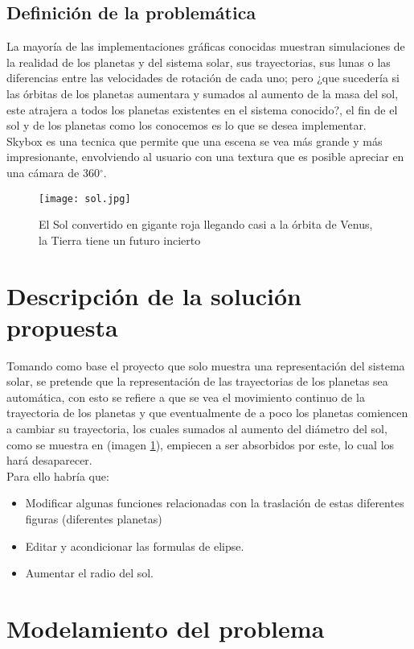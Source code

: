 \documentclass[12pt,journal,compsoc]{IEEEtran}
\begin{document}
\subsection{Definición de la problemática}
La mayoría de las implementaciones gráficas conocidas muestran simulaciones de la realidad de los planetas y del sistema solar, sus trayectorias, sus lunas o las diferencias entre las velocidades de rotación de cada uno; pero ¿que sucedería si las órbitas de los planetas aumentara y sumados al aumento de la masa del sol, este atrajera a todos los planetas existentes en el sistema conocido?, el fin de el sol y de los planetas como los conocemos es lo que se desea implementar.\\
Skybox es una tecnica que permite que una escena se vea más grande y más impresionante, envolviendo al usuario con una textura que es posible apreciar en una cámara de 360$^{\circ}$\cite{skybox2}.
\begin{figure}[h!]
  \texttt{[image: sol.jpg]}
  \caption{El Sol convertido en gigante roja llegando casi a la órbita de Venus, la Tierra tiene un futuro incierto}
  \captionsetup{justification=centering}
  \label{muerte}
\end{figure}
\section{Descripción de la solución propuesta}
Tomando como base el proyecto que solo muestra una representación del sistema solar, se pretende que la representación de las trayectorias de los planetas sea automática, con esto se refiere a que se vea el movimiento continuo de la trayectoria de los planetas y que eventualmente de a poco los planetas comiencen a cambiar su trayectoria, los cuales sumados al aumento del diámetro del sol, como se muestra en (imagen \ref{muerte}), empiecen a ser absorbidos por este, lo cual los hará desaparecer\cite{far}.\\
Para ello habría que:
\begin{itemize}
 \item Modificar algunas funciones relacionadas con la traslación de estas diferentes figuras (diferentes planetas)
 \item Editar y acondicionar las formulas de elipse.
 \item Aumentar el radio del sol.
\end{itemize}   %
\section{Modelamiento del problema}
\end{document}
